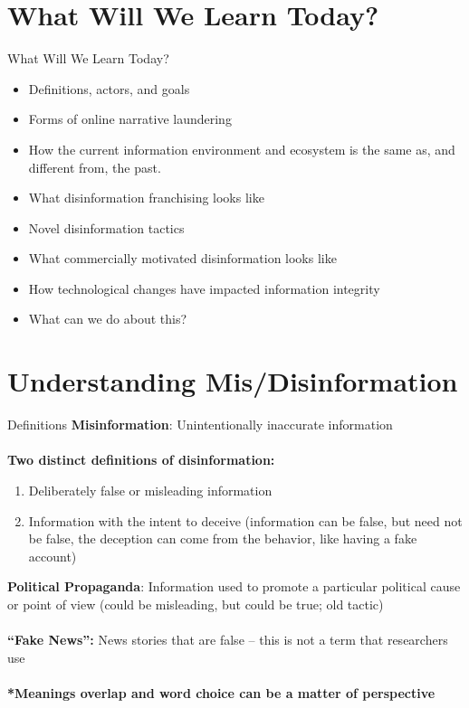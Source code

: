 \documentclass[nobackground,dvipsnames,table,aspectratio=169]{beamer}
\begin{document}
\section{What Will We Learn Today?}

\begin{frame}{What Will We Learn Today?}
    \large
    \begin{itemize}
        \item Definitions, actors, and goals
        \item Forms of online narrative laundering
        \item How the current information environment and ecosystem is the same as, and different from, the past.
        \item What disinformation franchising looks like
        \item Novel disinformation tactics
        \item What commercially motivated disinformation looks like
        \item How technological changes have impacted information integrity
        \item What can we do about this?
    \end{itemize}
\end{frame}

\section{Understanding Mis/Disinformation}

\begin{frame}{Definitions}
    \textbf{Misinformation}: Unintentionally inaccurate information\\~\\
    
    \textbf{Two distinct definitions of disinformation:}
    \begin{enumerate}
        \item Deliberately false or misleading information
        \item Information with the intent to deceive (information can be false, but need not be false, the deception can come from the behavior, like having a fake account)
    \end{enumerate}
    
    \textbf{Political Propaganda}: Information used to promote a particular political cause or point of view (could be misleading, but could be true; old tactic)\\~\\
    
    \textbf{“Fake News”:} News stories that are false – this is not a term that researchers use\\~\\
    
    \textbf{*Meanings overlap and word choice can be a matter of perspective}
\end{frame}
\end{document}
